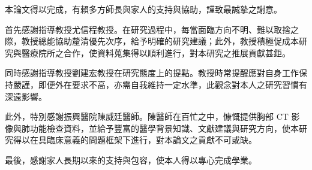 \begin{Thanks}

本論文得以完成，有賴多方師長與家人的支持與協助，謹致最誠摯之謝意。

首先感謝指導教授尤信程教授。在研究過程中，每當面臨方向不明、難以取捨之際，教授總能協助釐清優先次序，給予明確的研究建議；此外，教授積極促成本研究與醫療院所之合作，使資料蒐集得以順利進行，對本研究之推展貢獻甚鉅。

同時感謝指導教授劉建宏教授在研究態度上的提點。教授時常提醒應對自身工作保持嚴謹，即便外在要求不高，亦需自我維持一定水準，此觀念對本人之研究習慣有深遠影響。

此外，特別感謝振興醫院陳威廷醫師。陳醫師在百忙之中，慷慨提供胸部 CT 影像與肺功能檢查資料，並給予豐富的醫學背景知識、文獻建議與研究方向，使本研究得以在具臨床意義的問題框架下進行，對本論文之貢獻不可或缺。

最後，感謝家人長期以來的支持與包容，使本人得以專心完成學業。

\end{Thanks}